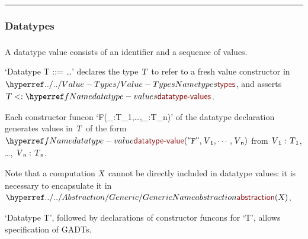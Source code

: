 

\begin{center}
\rule{3in}{0.4pt}
\end{center}

\subsubsection{Datatypes}\hypertarget{datatypes}{}\label{datatypes}

\begin{align*}
  [ \
  \KEY{Type} \quad & \NAMEREF{datatype-values} \\
  \KEY{Funcon} \quad & \NAMEREF{datatype-value} \\
  \KEY{Funcon} \quad & \NAMEREF{datatype-value-id} \\
  \KEY{Funcon} \quad & \NAMEREF{datatype-value-elements}
  \ ]
\end{align*}
A datatype value consists of an identifier and a sequence of values.

{}`Datatype T ::= \ldots{}{}' declares the type $\SHADE{\VAR{T}}$ to refer to a fresh value
  constructor in $\SHADE{\NAMEHYPER{../..}{Value-Types}{types}}$, and asserts $\SHADE{\VAR{T} <: \NAMEREF{datatype-values}}$.

Each constructor funcon {}`F(\_:T\_1,\ldots{},\_:T\_n){}' of the datatype declaration
  generates values in $\SHADE{\VAR{T}}$ of the form $\SHADE{\NAMEREF{datatype-value}
           (  \STRING{F}, 
                  \VAR{V}\SUB{1}, 
                  \cdots, 
                  \VAR{V}\SUB{n} )}$ from
  $\SHADE{\VAR{V}\SUB{1} : \VAR{T}\SUB{1}}$, \ldots{}, $\SHADE{\VAR{V}\SUB{n} : \VAR{T}\SUB{n}}$.

Note that a computation $\SHADE{\VAR{X}}$ cannot be directly included in datatype values:
  it is necessary to encapsulate it in $\SHADE{\NAMEHYPER{../../Abstraction}{Generic}{abstraction}
           (  \VAR{X} )}$.

{}`Datatype T{}', followed by declarations of constructor funcons for {}`T{}',
  allows specification of GADTs.

